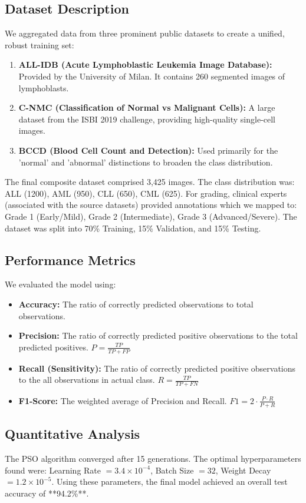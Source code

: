 \documentclass[12pt, a4paper]{article}
\begin{document}
\subsection{Dataset Description}
We aggregated data from three prominent public datasets to create a unified, robust training set:
\begin{enumerate}
    \item \textbf{ALL-IDB (Acute Lymphoblastic Leukemia Image Database):} Provided by the University of Milan. It contains 260 segmented images of lymphoblasts.
    \item \textbf{C-NMC (Classification of Normal vs Malignant Cells):} A large dataset from the ISBI 2019 challenge, providing high-quality single-cell images.
    \item \textbf{BCCD (Blood Cell Count and Detection):} Used primarily for the 'normal' and 'abnormal' distinctions to broaden the class distribution.
\end{enumerate}
The final composite dataset comprised 3,425 images. The class distribution was: ALL (1200), AML (950), CLL (650), CML (625). For grading, clinical experts (associated with the source datasets) provided annotations which we mapped to: Grade 1 (Early/Mild), Grade 2 (Intermediate), Grade 3 (Advanced/Severe).
The dataset was split into 70\% Training, 15\% Validation, and 15\% Testing.

\subsection{Performance Metrics}
We evaluated the model using:
\begin{itemize}
    \item \textbf{Accuracy:} The ratio of correctly predicted observations to total observations.
    \item \textbf{Precision:} The ratio of correctly predicted positive observations to the total predicted positives. $P = \frac{TP}{TP+FP}$
    \item \textbf{Recall (Sensitivity):} The ratio of correctly predicted positive observations to the all observations in actual class. $R = \frac{TP}{TP+FN}$
    \item \textbf{F1-Score:} The weighted average of Precision and Recall. $F1 = 2 \cdot \frac{P \cdot R}{P + R}$
\end{itemize}

\subsection{Quantitative Analysis}
The PSO algorithm converged after 15 generations. The optimal hyperparameters found were: Learning Rate $= 3.4 \times 10^{-4}$, Batch Size $= 32$, Weight Decay $= 1.2 \times 10^{-5}$.
Using these parameters, the final model achieved an overall test accuracy of **94.2\%**.
\end{document}
